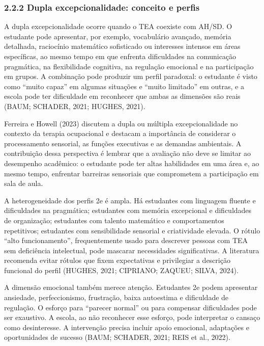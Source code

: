 \subsubsection{2.2.2 Dupla excepcionalidade: conceito e
perfis}\label{dupla-excepcionalidade-conceito-e-perfis}

A dupla excepcionalidade ocorre quando o TEA coexiste com AH/SD. O
estudante pode apresentar, por exemplo, vocabulário avançado, memória
detalhada, raciocínio matemático sofisticado ou interesses intensos em
áreas específicas, ao mesmo tempo em que enfrenta dificuldades na
comunicação pragmática, na flexibilidade cognitiva, na regulação
emocional e na participação em grupos. A combinação pode produzir um
perfil paradoxal: o estudante é visto como ``muito capaz'' em algumas
situações e ``muito limitado'' em outras, e a escola pode ter
dificuldade em reconhecer que ambas as dimensões são reais (BAUM;
SCHADER, 2021; HUGHES, 2021).

Ferreira e Howell (2023) discutem a dupla ou múltipla excepcionalidade
no contexto da terapia ocupacional e destacam a importância de
considerar o processamento sensorial, as funções executivas e as
demandas ambientais. A contribuição dessa perspectiva é lembrar que a
avaliação não deve se limitar ao desempenho acadêmico: o estudante pode
ter altas habilidades em uma área e, ao mesmo tempo, enfrentar barreiras
sensoriais que comprometem a participação em sala de aula.

A heterogeneidade dos perfis 2e é ampla. Há estudantes com linguagem
fluente e dificuldades na pragmática; estudantes com memória excepcional
e dificuldades de organização; estudantes com talento matemático e
comportamentos repetitivos; estudantes com sensibilidade sensorial e
criatividade elevada. O rótulo ``alto funcionamento'', frequentemente
usado para descrever pessoas com TEA sem deficiência intelectual, pode
mascarar necessidades significativas. A literatura recomenda evitar
rótulos que fixem expectativas e privilegiar a descrição funcional do
perfil (HUGHES, 2021; CIPRIANO; ZAQUEU; SILVA, 2024).

A dimensão emocional também merece atenção. Estudantes 2e podem
apresentar ansiedade, perfeccionismo, frustração, baixa autoestima e
dificuldade de regulação. O esforço para ``parecer normal'' ou para
compensar dificuldades pode ser exaustivo. A escola, ao não reconhecer
esse esforço, pode interpretar o cansaço como desinteresse. A
intervenção precisa incluir apoio emocional, adaptações e oportunidades
de sucesso (BAUM; SCHADER, 2021; REIS et al., 2022).

